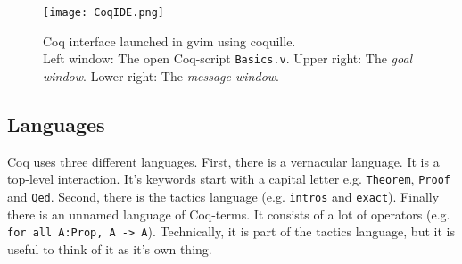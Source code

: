 \begin{figure}[h]
\texttt{[image: CoqIDE.png]}
\caption{Coq interface launched in gvim using coquille.\\ 
Left window: The open Coq-script \texttt{Basics.v}.
Upper right: The {\itshape goal window}. 
Lower right: The {\itshape message window}.}
\label{fig:Coquille}
\end{figure}

\subsection{Languages}
Coq uses three different languages. 
First, there is a vernacular language. 
It is a top-level interaction. 
It's keywords start with a capital letter e.g. \lstinline!Theorem!, \lstinline!Proof! and  \lstinline!Qed!. 
Second, there is the tactics language (e.g. \lstinline!intros! and \lstinline!exact!).
Finally there is an unnamed language of Coq-terms. 
It consists of a lot of operators (e.g. \lstinline!for all A:Prop, A -> A!).
Technically, it is part of the tactics language, but it is useful to think of it as it's own thing.